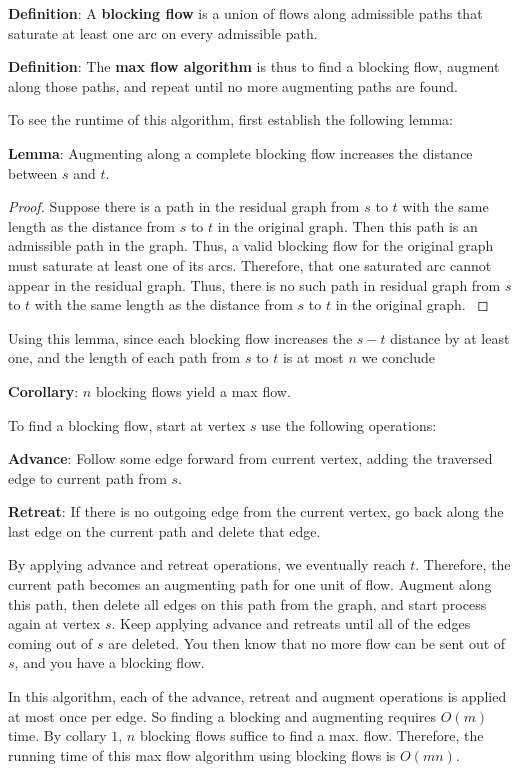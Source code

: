 \documentclass{article}
\begin{document}
\textbf{Definition}:
A {\bf blocking flow} is a union of flows along admissible
paths that saturate at least one arc on every admissible path.

\textbf{Definition}:
The {\bf max flow algorithm} is thus to find a blocking flow, augment along those paths, 
and repeat until no more augmenting paths are found.

To see the runtime of this algorithm, first establish the following lemma:

\textbf{Lemma}:
  Augmenting along a complete blocking flow increases the
distance between $s$ and $t$. 

\begin{proof}{ Suppose there is a path in the residual graph from $s$ to $t$
with the same length as the distance from $s$ to $t$ in the original graph. 
Then this path is an admissible path in the graph. Thus, a valid blocking flow 
for the original graph must saturate at least one of its arcs. Therefore, that one 
saturated arc cannot appear in the residual graph.  Thus, there is no such path
in residual graph from $s$ to $t$ with the same length as the distance from $s$ to
$t$ in the original graph. }\end{proof}

Using this lemma, since each blocking flow increases the $s-t$
distance by at least one, and the length of each path from $s$ to
$t$ is at most $n$ we conclude

\textbf{Corollary}:
$n$ blocking flows yield a max flow.

To find a blocking flow, start at vertex $s$ use the following operations:

{\bf Advance}: Follow some edge forward from current vertex,
adding the traversed edge to current path from $s$.

{\bf Retreat}: If there is no outgoing edge from the current vertex,
go back along the last edge on the current path and delete that edge.

By applying advance and retreat operations, we eventually reach
$t$.  Therefore, the current path becomes an augmenting path for one
unit of flow.  Augment along this path, then delete all edges on this path
from the graph, and start process again at vertex $s$.  Keep applying
advance and retreats until all of the edges coming out of $s$ are deleted.
You then know that no more flow can be sent out of $s$, and you have
a blocking flow.

In this algorithm, each of the advance, retreat and augment operations
is applied at most once per edge. So finding a blocking and augmenting 
requires $O(m)$ time.  By collary $1$, $n$ blocking flows suffice to find a max.
flow.  Therefore, the running time of this max flow algorithm using blocking
flows is $O(mn)$.
\end{document}
